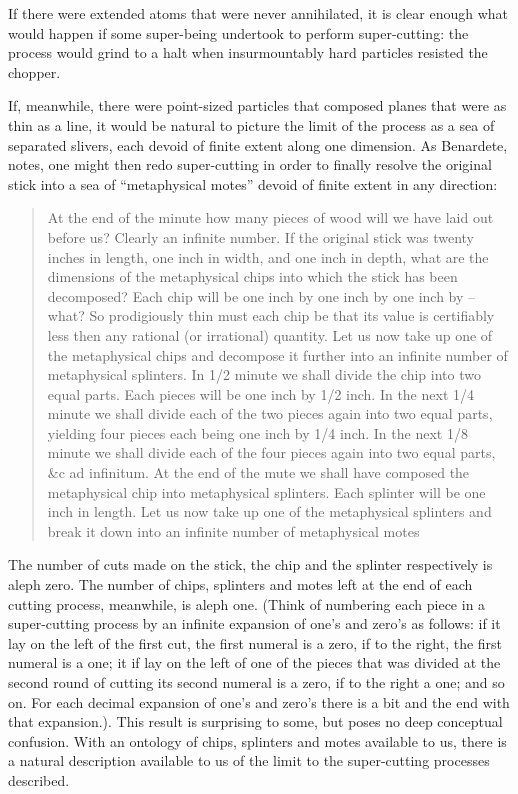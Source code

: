 If there were extended atoms that were never annihilated, it is clear enough what would happen if some super-being undertook to perform super-cutting: the process would grind to a halt when insurmountably hard particles resisted the chopper. 

If, meanwhile, there were point-sized particles that composed planes that were as thin as a line, it would be natural to picture the limit of the process as a sea of separated slivers, each devoid of finite extent along one dimension. As Benardete, notes, one might then redo super-cutting in order to finally resolve the original stick into a sea of ``metaphysical motes'' devoid of finite extent in any direction:

\begin{quote}
At the end of the minute how many pieces of wood will we have laid out before us? Clearly an infinite number. If the original stick was twenty inches in length, one inch in width, and one inch in depth, what are the dimensions of the metaphysical chips into which the stick has been decomposed? Each chip will be one inch by one inch by one inch by -- what? So prodigiously thin must each chip be that its value is certifiably less then any rational (or irrational) quantity. Let us now take up one of the metaphysical chips and decompose it further into an infinite number of metaphysical splinters. In 1/2 minute we shall divide the chip into two equal parts. Each pieces will be one inch by 1/2 inch. In the next 1/4 minute we shall divide each of the two pieces again into two equal parts, yielding four pieces each being one inch by 1/4 inch. In the next 1/8 minute we shall divide each of the four pieces again into two equal parts, \&c ad infinitum. At the end of the mute we shall have composed the metaphysical chip into metaphysical splinters. Each splinter will be one inch in length. Let us now take up one of the metaphysical splinters and break it down into an infinite number of metaphysical motes \cite[184-5]{Bernadete1964}
\end{quote}

\noindent The number of cuts made on the stick, the chip and the splinter respectively is aleph zero. The number of chips, splinters and motes left at the end of each cutting process, meanwhile, is aleph one. (Think of numbering each piece in a super-cutting process by an infinite expansion of one's and zero's as follows: if it lay on the left of the first cut, the first numeral is a zero, if to the right, the first numeral is a one; it if lay on the left of one of the pieces that was divided at the second round of cutting its second numeral is a zero, if to the right a one; and so on. For each decimal expansion of one's and zero's there is a bit and the end with that expansion.). This result is surprising to some, but poses no deep conceptual confusion. With an ontology of chips, splinters and motes available to us, there is a natural description available to us of the limit to the super-cutting processes described.  

